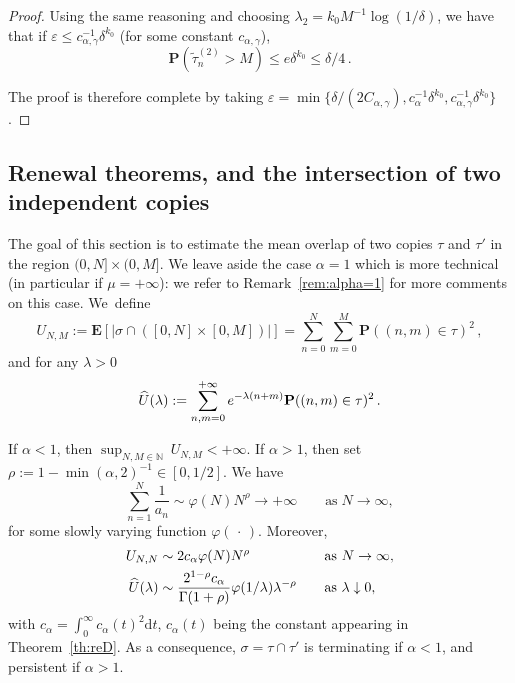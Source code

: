 \documentclass[10pt]{amsart}
\theoremstyle{definition}\newtheorem{defi}[theo]{Definition}\newtheorem{rema}[theo]{Remark}\newtheorem{exam}[theo]{Example}\newtheorem{exem}[theo]{Example}\newtheorem{nota}[theo]{Notation}
\newcommand{\ga}{\alpha}
\newcommand{\gd}{\delta}
\newcommand{\gep}{\varepsilon}
\newcommand{\gl}{\lambda}
\newcommand{\dd}{\mathrm{d}}
\renewcommand{\tilde}{\widetilde}
\let\oldhat\hat
\renewcommand*{\hat}[1]{\mathchoice{\widehat{#1}}{\widehat{#1}}{\oldhat{#1}}{\oldhat{#1}}}
\newcommand{\bP}{\ensuremath{\mathbf{P}}}
\newcommand{\bE}{\ensuremath{\mathbf{E}}}
\newcommand{\bbN}{\ensuremath{\mathbb{N}}}
\begin{document}
\begin{appendix}
\begin{proof}
Using the same reasoning and choosing $\lambda_2 = k_0 M^{-1} \log (1/\delta)$, we have that if $\gep\leq c_{\ga,\gamma}^{-1} \gd^{k_0}$ (for some constant $c_{\ga,\gamma}$),
\begin{equation}
\bP(\tilde{\tau}^{(2)}_n > M) \le e \delta^{k_0} \leq \gd/4\,.
\end{equation}

The proof is therefore complete by taking $\gep = \min \lbrace \delta / (2 C_{\ga,\gamma}), c_{\ga}^{-1} \delta^{k_0}, c_{\ga,\gamma}^{-1} \delta^{k_0} \rbrace$.
\end{proof}

\subsection{Renewal theorems, and the intersection of two independent copies}

The goal of this section is to estimate the mean overlap of two copies $\tau$ and $\tau'$ in the region $(0,N]\times (0,M]$. We leave aside the case $\ga=1$ which is more technical (in particular if $\mu=+\infty$): we refer to Remark~\ref{rem:alpha=1} for more comments on this case. We~define
\begin{equation}\label{eq:UNM}
U_{N,M}:= \bE\left[\left| \sigma\cap \left([0,N]\times [0,M]\right) \right|\right] =\sum_{n=0}^{N} \sum_{m=0}^{M} \bP((n,m)\in\tau)^2\,,
\end{equation}
and for any $\gl>0$
\begin{equation}
\hat U (\gl) := \sum_{n,m=0}^{+\infty} e^{-\gl (n+m)} \bP((n,m)\in\tau)^2\,.
\end{equation}

\begin{prop}\label{prop:transience}
If $\ga<1$, then $\sup_{N,M\in\bbN} \ U_{N,M} <+\infty.$ If $\ga>1$, then set $\rho:=1-\min(\ga,2)^{-1} \in [0,1/2]$. We have
\begin{equation}\label{suman}
\sum_{n=1}^N \frac{1}{a_n} \sim \varphi(N) N^{\rho} \to +\infty \qquad \text{as}\;N\to\infty,
\end{equation}
for some slowly varying function $ \varphi ({\,\cdot\,})$. Moreover,
\begin{equation}\label{eq:asympUn}
\begin{aligned}
U_{N,N}&\sim 2 c_{\ga} \varphi(N) N^{\rho} &&\quad \text{as } N\to\infty, \\
\hat U(\gl) & \sim \frac{2^{1-\rho} c_{\ga}}{\Gamma(1+\rho)} \varphi(1/\gl) \gl^{-\rho} &&\quad \text{as } \gl\downarrow 0,
\end{aligned}
\end{equation}
with $c_{\ga} = \int_{0}^{\infty} c_{\ga}(t)^2 \dd t$, $c_{\ga}(t)$ being the constant appearing in Theorem~\ref{th:reD}.
As a consequence, $\sigma=\tau\cap\tau'$ is terminating if $\ga<1$, and persistent if $\ga> 1$.
\end{prop}


\end{appendix}
\end{document}
